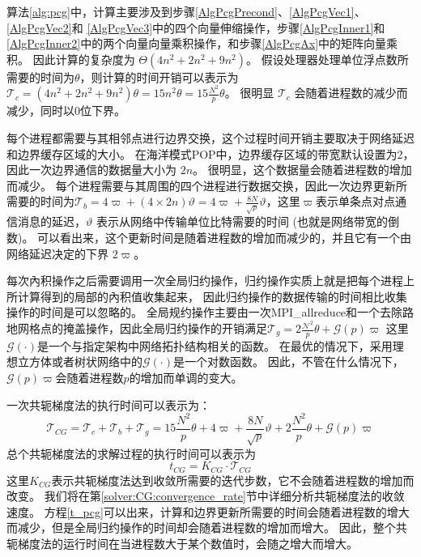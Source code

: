 算法\ref{alg:pcg}中，计算主要涉及到步骤\ref{AlgPcgPrecond}、\ref{AlgPcgVec1}、\ref{AlgPcgVec2}和 \ref{AlgPcgVec3}中的四个向量伸缩操作，步骤\ref{AlgPcgInner1}和\ref{AlgPcgInner2}中的两个向量向量乘积操作，和步骤\ref{AlgPcgAx}中的矩阵向量乘积。 
因此计算的复杂度为 $\Theta (4 n^2 +2n^2+ 9n^2)$。 
假设处理器处理单位浮点数所需要的时间为$\theta$，则计算的时间开销可以表示为
$\mathcal{T}_c=  (4 n^2 +2n^2+ 9n^2)\theta = 15n^2\theta  = 15\frac{N^2}{p}\theta $。 
很明显 $\mathcal{T}_c$ 会随着进程数的减少而减少，同时以0位下界。 


每个进程都需要与其相邻点进行边界交换，这个过程时间开销主要取决于网络延迟和边界缓存区域的大小。 
在海洋模式POP中，边界缓存区域的带宽默认设置为2，因此一次边界通信的数据量大小为 $2n$。 
很明显，这个数据量会随着进程数的增加而减少。 
每个进程需要与其周围的四个进程进行数据交换，因此一次边界更新所需要的时间为$\mathcal{T}_b =4\varpi + (4\times 2n)\vartheta=4\varpi + \frac{8N}{\sqrt{p}}\vartheta$，这里$\varpi$表示单条点对点通信消息的延迟，$\vartheta$ 表示从网络中传输单位比特需要的时间 (也就是网络带宽的倒数)。 
可以看出来，这个更新时间是随着进程数的增加而减少的，并且它有一个由网络延迟决定的下界 $2\varpi$。



每次內积操作之后需要调用一次全局归约操作，归约操作实质上就是把每个进程上所计算得到的局部的內积值收集起来，
因此归约操作的数据传输的时间相比收集操作的时间是可以忽略的。 
全局规约操作主要由一次MPI\_allreduce和一个去除路地网格点的掩盖操作，因此全局归约操作的开销满足$\mathcal{T}_g= 2\frac{\mathcal{N}^2}{p}\theta + \mathcal{G}(p)\varpi$  
这里$\mathcal{G}(\cdot)$是一个与指定架构中网络拓扑结构相关的函数。 
在最优的情况下，采用理想立方体或者树状网络中的$\mathcal{G}(\cdot)$是一个对数函数。 
因此，不管在什么情况下，$\mathcal{G}(p)\varpi$会随着进程数$p$的增加而单调的变大。 
 
一次共轭梯度法的执行时间可以表示为：
\begin{equation}
\label{t_pcg}
\mathcal{T}_{CG} = \mathcal{T}_c + \mathcal{T}_b + \mathcal{T}_g
= 15\frac{N^2}{p}\theta + 4\varpi + \frac{8N}{\sqrt{p}}\vartheta+2\frac{N^2}{p}\theta + \mathcal{G}(p)\varpi
\end{equation}
总个共轭梯度法的求解过程的执行时间可以表示为
\begin{equation}
\label{t_pcg_all}
t_{CG} = K_{CG}\cdot \mathcal{T}_{CG}
\end{equation}
这里$K_{CG}$表示共轭梯度法达到收敛所需要的迭代步数，它不会随着进程数的增加而改变。
我们将在第\ref{solver:CG:convergence_rate}节中详细分析共轭梯度法的收敛速度。
方程\ref{t_pcg}可以出来，计算和边界更新所需要的时间会随着进程数的增大而减少，但是全局归约操作的时间却会随着进程数的增加而增大。
因此，整个共轭梯度法的运行时间在当进程数大于某个数值时，会随之增大而增大。


